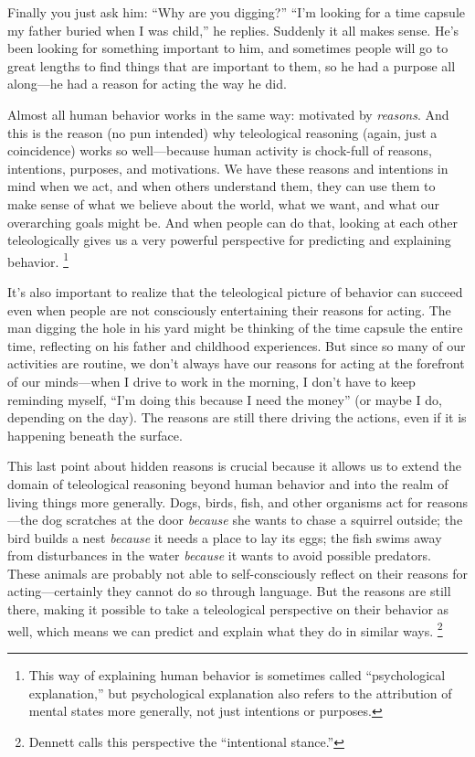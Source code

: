 		Finally you just ask him: ``Why are you digging?'' ``I'm looking for a time capsule my father buried when I was child,'' he replies. Suddenly it all makes sense. He's been looking for something important to him, and sometimes people will go to great lengths to find things that are important to them, so he had a purpose all along---he had a reason for acting the way he did.
		
		Almost all human behavior works in the same way: motivated by \textit{reasons}. And this is the reason (no pun intended) why teleological reasoning (again, just a coincidence) works so well---because human activity is chock-full of reasons, intentions, purposes, and motivations. We have these reasons and intentions in mind when we act, and when others understand them, they can use them to make sense of what we believe about the world, what we want, and what our overarching goals might be. And when people can do that, looking at each other teleologically gives us a very powerful perspective for predicting and explaining behavior.%
			\footnote{This way of explaining human behavior is sometimes called ``psychological explanation,'' but psychological explanation also refers to the attribution of mental states more generally, not just intentions or purposes.}
			
		It's also important to realize that the teleological picture of behavior can succeed even when people are not consciously entertaining their reasons for acting. The man digging the hole in his yard might be thinking of the time capsule the entire time, reflecting on his father and childhood experiences. But since so many of our activities are routine, we don't always have our reasons for acting at the forefront of our minds---when I drive to work in the morning, I don't have to keep reminding myself, ``I'm doing this because I need the money'' (or maybe I do, depending on the day). The reasons are still there driving the actions, even if it is happening beneath the surface.
		
		This last point about hidden reasons is crucial because it allows us to extend the domain of teleological reasoning beyond human behavior and into the realm of living things more generally. Dogs, birds, fish, and other organisms act for reasons---the dog scratches at the door \textit{because} she wants to chase a squirrel outside; the bird builds a nest \textit{because} it needs a place to lay its eggs; the fish swims away from disturbances in the water \textit{because} it wants to avoid possible predators. These animals are probably not able to self-consciously reflect on their reasons for acting---certainly they cannot do so through language. But the reasons are still there, making it possible to take a teleological perspective on their behavior as well, which means we can predict and explain what they do in similar ways.%
			\footnote{Dennett calls this perspective the ``intentional stance.''}
		
